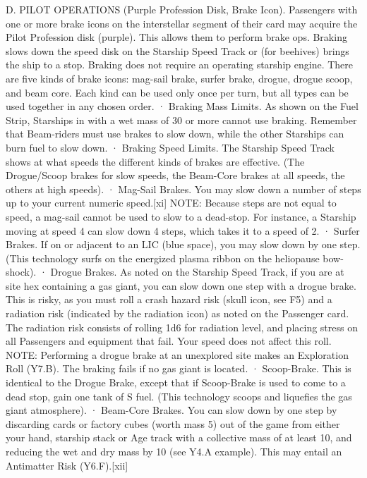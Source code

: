 \documentclass[a4paper]{book}
\begin{document}
D. PILOT OPERATIONS (Purple Profession Disk, Brake Icon). Passengers with one or more brake icons on the interstellar segment of their card may acquire the Pilot Profession disk (purple). This allows them to perform brake ops. Braking slows down the speed disk on the Starship Speed Track or (for beehives) brings the ship to a stop. Braking does not require an operating starship engine.
There are five kinds of brake icons: mag-sail brake, surfer brake, drogue, drogue scoop, and beam core. Each kind can be used only once per turn, but all types can be used together in any chosen order.
·       Braking Mass Limits. As shown on the Fuel Strip, Starships in with a wet mass of 30 or more cannot use braking. Remember that Beam-riders must use brakes to slow down, while the other Starships can burn fuel to slow down.
·       Braking Speed Limits. The Starship Speed Track shows at what speeds the different kinds of brakes are effective. (The Drogue/Scoop brakes for slow speeds, the Beam-Core brakes at all speeds, the others at high speeds).
·       Mag-Sail Brakes. You may slow down a number of steps up to your current numeric speed.[xi]
NOTE: Because steps are not equal to speed, a mag-sail cannot be used to slow to a dead-stop. For instance, a Starship moving at speed 4 can slow down 4 steps, which takes it to a speed of 2.
·       Surfer Brakes. If on or adjacent to an LIC (blue space), you may slow down by one step. (This technology surfs on the energized plasma ribbon on the heliopause bow-shock).
·       Drogue Brakes. As noted on the Starship Speed Track, if you are at site hex containing a gas giant, you can slow down one step with a drogue brake. This is risky, as you must roll a crash hazard risk (skull icon, see F5) and a radiation risk (indicated by the radiation icon) as noted on the Passenger card. The radiation risk consists of rolling 1d6 for radiation level, and placing stress on all Passengers and equipment that fail. Your speed does not affect this roll.
NOTE: Performing a drogue brake at an unexplored site makes an Exploration Roll (Y7.B). The braking fails if no gas giant is located.
·       Scoop-Brake. This is identical to the Drogue Brake, except that if Scoop-Brake is used to come to a dead stop, gain one tank of S fuel. (This technology scoops and liquefies the gas giant atmosphere).
·       Beam-Core Brakes. You can slow down by one step by discarding cards or factory cubes (worth mass 5) out of the game from either your hand, starship stack or Age track with a collective mass of at least 10, and reducing the wet and dry mass by 10 (see Y4.A example). This may entail an Antimatter Risk (Y6.F).[xii]
\end{document}
